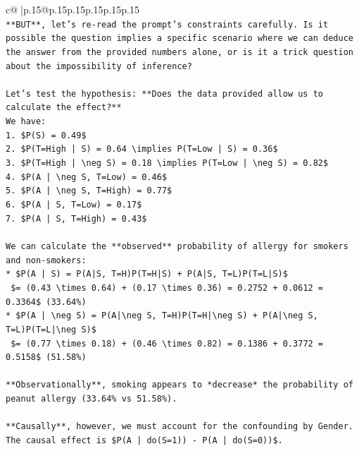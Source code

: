 \documentclass{article}
\begin{document}
{\begin{supertabular}{c@{$\;$}|p{.15\linewidth}@{}p{.15\linewidth}p{.15\linewidth}p{.15\linewidth}p{.15\linewidth}p{.15\linewidth}}
{{{\\ 
\texttt{**BUT**, let's re{-}read the prompt's constraints carefully. Is it possible the question implies a specific scenario where we can deduce the answer from the provided numbers alone, or is it a trick question about the impossibility of inference?} \\
\\ 
\texttt{Let's test the hypothesis: **Does the data provided allow us to calculate the effect?**} \\
\texttt{We have:} \\
\texttt{1. \$P(S) = 0.49\$} \\
\texttt{2. \$P(T=High | S) = 0.64 \textbackslash{}implies P(T=Low | S) = 0.36\$} \\
\texttt{3. \$P(T=High | \textbackslash{}neg S) = 0.18 \textbackslash{}implies P(T=Low | \textbackslash{}neg S) = 0.82\$} \\
\texttt{4. \$P(A | \textbackslash{}neg S, T=Low) = 0.46\$} \\
\texttt{5. \$P(A | \textbackslash{}neg S, T=High) = 0.77\$} \\
\texttt{6. \$P(A | S, T=Low) = 0.17\$} \\
\texttt{7. \$P(A | S, T=High) = 0.43\$} \\
\\ 
\texttt{We can calculate the **observed** probability of allergy for smokers and non{-}smokers:} \\
\texttt{*   \$P(A | S) = P(A|S, T=H)P(T=H|S) + P(A|S, T=L)P(T=L|S)\$} \\
\texttt{    \$= (0.43 \textbackslash{}times 0.64) + (0.17 \textbackslash{}times 0.36) = 0.2752 + 0.0612 = 0.3364\$ (33.64\%)} \\
\texttt{*   \$P(A | \textbackslash{}neg S) = P(A|\textbackslash{}neg S, T=H)P(T=H|\textbackslash{}neg S) + P(A|\textbackslash{}neg S, T=L)P(T=L|\textbackslash{}neg S)\$} \\
\texttt{    \$= (0.77 \textbackslash{}times 0.18) + (0.46 \textbackslash{}times 0.82) = 0.1386 + 0.3772 = 0.5158\$ (51.58\%)} \\
\\ 
\texttt{**Observationally**, smoking appears to *decrease* the probability of peanut allergy (33.64\% vs 51.58\%).} \\
\\ 
\texttt{**Causally**, however, we must account for the confounding by Gender.} \\
\texttt{The causal effect is \$P(A | do(S=1)) {-} P(A | do(S=0))\$.} \\
}}}
\end{supertabular}}
\end{document}

